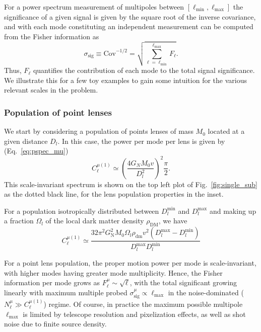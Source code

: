 \documentclass[twocolumn]{aastex63}
\begin{document}
For a power spectrum measurement of multipoles between $[\ell_\mathrm{min}, \ell_\mathrm{max}]$ the significance of a given signal is given by the square root of the inverse covariance, and with each mode constituting an independent measurement can be computed from the Fisher information as
\begin{equation}
\sigma_\mathrm{sig}\equiv\mathrm{Cov}^{-1/2}=\sqrt{\sum_{\ell = \ell_\mathrm{min}}^{\ell_\mathrm{max}}F_\ell}.
\label{eq:signif}
\end{equation}
Thus, $F_\ell$ quantifies the contribution of each mode to the total signal significance. We illustrate this for a few toy examples to gain some intuition for the various relevant scales in the problem.

\subsubsection{Population of point lenses}

We start by considering a population of points lenses of mass $M_0$ located at a given distance $D_l$. In this case, the power per mode per lens is given by (Eq.~\ref{eq:pspec_mu})
\begin{equation}
C_{\ell}^{\mu (1)} \simeq \left(\frac{4 G_N M_0 v}{D_l^2}\right)^2 \frac{\pi}{2}.
\end{equation}
This scale-invariant spectrum is shown on the top left plot of Fig.~\ref{fig:single_sub} as the dotted black line, for the lens population properties in the inset.

For a population isotropically distributed between $D_l^{\mathrm{min}}$ and $D_l^{\mathrm{max}}$ and making up a fraction $\Omega_l$ of the local dark matter density $\rho_\mathrm{DM}$, we have
\begin{equation}
C_{\ell}^{\mu (1)} \simeq \frac{32 \pi^{2} G_{\mathrm{N}}^{2} M_{0} \Omega_{l} \rho_{\mathrm{dm}} v^{2}\left(D_{l}^{\mathrm{max}}-D_{l}^{\mathrm{min}}\right)}{D_{l}^{\mathrm{max}} D_{l}^{\mathrm{min}}}
\label{eq:mu_pspop}
\end{equation}

For a point lens population, the proper motion power per mode is scale-invariant, with higher modes having greater mode multiplicity. Hence, the Fisher information per mode grows as $F_\ell^\mu\sim \sqrt{\ell}$, with the total significant growing linearly with maximum multiple probed $\sigma_\mathrm{sig}^\mu\propto\ell_\mathrm{max}$ in the noise-dominated ($N_\ell^\mu\gg C_{\ell}^{\mu (1)}$) regime. Of course, in practice the maximum possible multipole $\ell_\mathrm{max}$ is limited by telescope resolution and pixelization effects, as well as shot noise due to finite source density.
\end{document}
